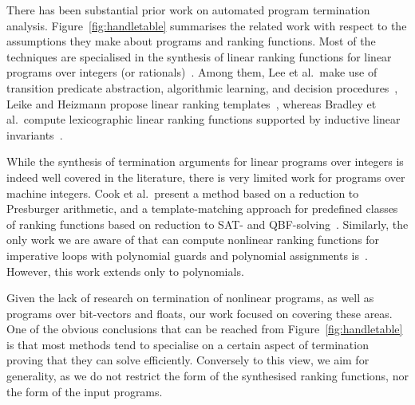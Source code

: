 \documentclass[a4paper]{llncs}
\begin{document}
There has been substantial prior work on automated program termination
analysis.  Figure~\ref{fig:handletable} summarises the related work with
respect to the assumptions they make about programs and ranking functions. 
Most of the techniques are specialised in the synthesis of linear ranking
functions for linear programs over integers (or
rationals)~\cite{DBLP:conf/pldi/CookPR06,DBLP:conf/cav/LeeWY12,DBLP:conf/popl/Ben-AmramG13,DBLP:conf/vmcai/P04,DBLP:conf/atva/HeizmannHLP13,DBLP:conf/cav/BradleyMS05,DBLP:conf/tacas/CookSZ13,DBLP:conf/cav/KroeningSTW10}.  Among them, Lee et
al.~make use of transition predicate abstraction, algorithmic learning, and
decision procedures~\cite{DBLP:conf/cav/LeeWY12}, Leike and Heizmann propose
linear ranking templates~\cite{DBLP:conf/tacas/LeikeH14}, whereas Bradley et
al.~compute lexicographic linear ranking functions supported by inductive
linear invariants~\cite{DBLP:conf/cav/BradleyMS05}.

While the synthesis of termination arguments for linear programs over
integers is indeed well covered in the literature, there is very limited
work for programs over machine integers.  Cook et al.~present a method
based on a reduction to Presburger arithmetic, and a template-matching
approach for predefined classes of ranking functions based on reduction to
SAT- and QBF-solving~\cite{DBLP:conf/tacas/CookKRW10}.  Similarly, the only
work we are aware of that can compute nonlinear ranking functions for
imperative loops with polynomial guards and polynomial assignments
is~\cite{DBLP:conf/vmcai/BradleyMS05}.  However, this work extends only to
polynomials.

Given the lack of research on termination of nonlinear programs, as well as
programs over bit-vectors and floats, our work focused on covering these
areas.  One of the obvious conclusions that can be reached from
Figure~\ref{fig:handletable} is that most methods tend to specialise on a
certain aspect of termination proving that they can solve efficiently. 
Conversely to this view, we aim for generality, as we do not restrict the
form of the synthesised ranking functions, nor the form of the input
programs. 

\end{document}
